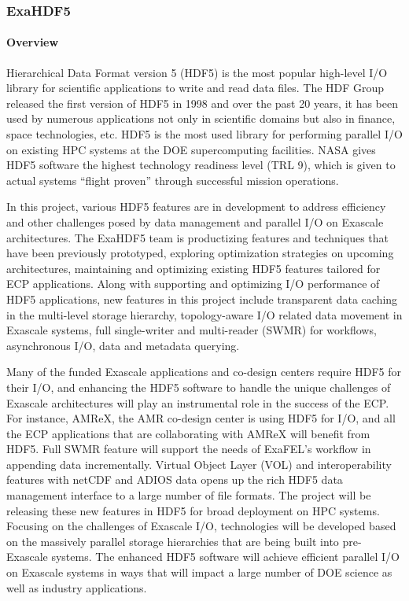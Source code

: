 \subsubsection{ExaHDF5}\label{subsubsect:exahdf5}

\paragraph{Overview} 

Hierarchical Data Format version 5 (HDF5) is the most popular high-level I/O library for scientific applications to write and read data files. The HDF Group released the first version of HDF5 in 1998 and over the past 20 years, it has been used by numerous applications not only in scientific domains but also in finance, space technologies, etc. HDF5 is the most used library for performing parallel I/O on existing HPC systems at the DOE supercomputing facilities. NASA gives HDF5 software the highest technology readiness level (TRL 9), which is given to actual systems “flight proven” through successful mission operations.

In this project, various HDF5 features are in development to address efficiency and other challenges posed by data management and parallel I/O on Exascale architectures. The ExaHDF5 team is productizing features and techniques that have been previously prototyped, exploring optimization strategies on upcoming architectures, maintaining and optimizing existing HDF5 features tailored for ECP applications. Along with supporting and optimizing I/O performance of HDF5 applications, new features in this project include transparent data caching in the multi-level storage hierarchy, topology-aware I/O related data movement in Exascale systems, full single-writer and multi-reader (SWMR) for workflows, asynchronous I/O, data and metadata querying. 

Many of the funded Exascale applications and co-design centers require HDF5 for their I/O, and enhancing the HDF5 software to handle the unique challenges of Exascale architectures will play an instrumental role in the success of the ECP. For instance, AMReX, the AMR co-design center is using HDF5 for I/O, and all the ECP applications that are collaborating with AMReX will benefit from HDF5. Full SWMR feature will support the needs of ExaFEL's workflow in appending data incrementally. Virtual Object Layer (VOL) and interoperability features with netCDF and ADIOS data opens up the rich HDF5 data management interface to a large number of file formats. The project will be releasing these new features in HDF5 for broad deployment on HPC systems. Focusing on the challenges of Exascale I/O, technologies will be developed based on the massively parallel storage hierarchies that are being built into pre-Exascale systems. The enhanced HDF5 software will achieve efficient parallel I/O on Exascale systems in ways that will impact a large number of DOE science as well as industry applications.

